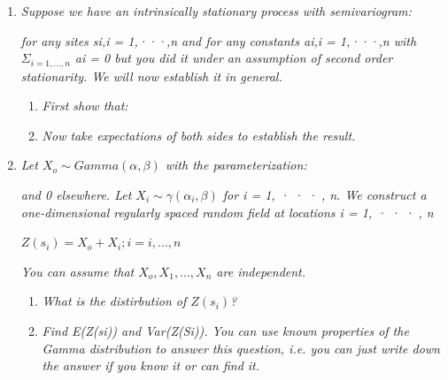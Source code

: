 \documentclass{article}\usepackage[]{graphicx}\usepackage[]{color}
\begin{document}
\begin{enumerate}
\item %
{\it Suppose we have an intrinsically stationary process with semivariogram:}

\vspace{1in}

{\it for any sites si,i = 1,···,n and for any constants ai,i = 1,···,n with  $\Sigma_{i=1,...,n}$ ai = 0 but you did it under an assumption of second order stationarity. We will now establish it in general.}



\begin{enumerate}
\item%
{\it First show that:}

\vspace{3in}

\item%
{\it Now take expectations of both sides to establish the result.}

\vspace{3in}
\end{enumerate}
\newpage

\item %
{\it Let $X_{o} \sim Gamma(\alpha,\beta)$ with the parameterization:}

\vspace{0.5in}

{\it and 0 elsewhere. Let $X_{i} \sim \gamma(\alpha_{i}, \beta)$ for i = 1, · · · , n. We construct a one-dimensional regularly spaced random field at locations i = 1, · · · , n}

\begin{center}
$Z(s_{i}) = X_{o} + X_{i}; i = i,...,n$
\end{center}

{\it You can assume that $X_{o}, X_{1}, ..., X_{n}$ are independent.}

\begin{enumerate}
\item %
{\it What is the distirbution of $Z(s_{i})$?}

\vspace{2in}

\item %
{\it Find E(Z(si)) and Var(Z(Si)). You can use known properties of the Gamma distribution to answer this question, i.e. you can just write down the answer if you know it or can find it.}

\vspace{2in}


\end{enumerate}
\end{enumerate}
\end{document}
